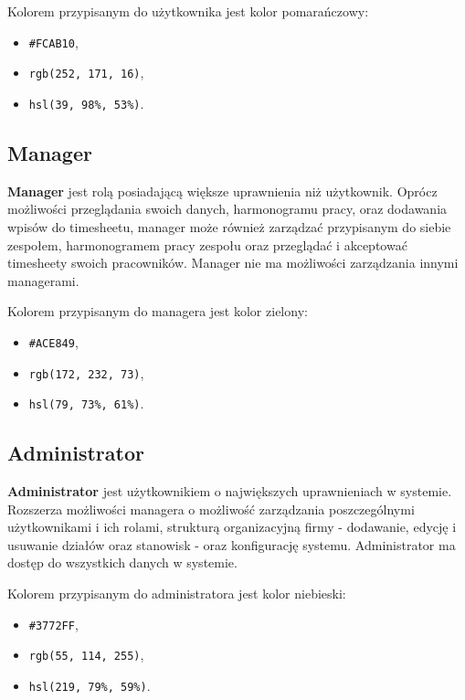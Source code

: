 Kolorem przypisanym do użytkownika jest kolor pomarańczowy:
\begin{itemize}
    \item \texttt{\#FCAB10},
    \item \texttt{rgb(252, 171, 16)},
    \item \texttt{hsl(39, 98\%, 53\%)}.
\end{itemize}

\subsection{Manager}

\textbf{Manager} jest rolą posiadającą większe uprawnienia niż użytkownik. Oprócz możliwości przeglądania swoich danych, harmonogramu pracy, oraz dodawania wpisów do timesheetu, manager może również zarządzać przypisanym do siebie zespołem, harmonogramem pracy zespołu oraz przeglądać i akceptować timesheety swoich pracowników. Manager nie ma możliwości zarządzania innymi managerami.

Kolorem przypisanym do managera jest kolor zielony:
\begin{itemize}
    \item \texttt{\#ACE849},
    \item \texttt{rgb(172, 232, 73)},
    \item \texttt{hsl(79, 73\%, 61\%)}.
\end{itemize}

\subsection{Administrator}

\textbf{Administrator} jest użytkownikiem o największych uprawnieniach w systemie. Rozszerza możliwości managera o możliwość zarządzania poszczególnymi użytkownikami i ich rolami, strukturą organizacyjną firmy - dodawanie, edycję i usuwanie działów oraz stanowisk - oraz konfigurację systemu. Administrator ma dostęp do wszystkich danych w systemie.

Kolorem przypisanym do administratora jest kolor niebieski:
\begin{itemize}
    \item \texttt{\#3772FF},
    \item \texttt{rgb(55, 114, 255)},
    \item \texttt{hsl(219, 79\%, 59\%)}.
\end{itemize}


